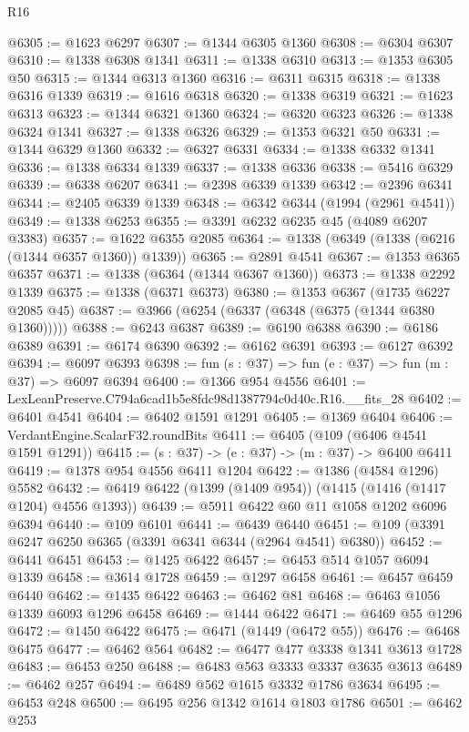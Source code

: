 \begin{lexlean}{R16}
\begin{coremodule}
@6305 := @1623 @6297
@6307 := @1344 @6305 @1360
@6308 := @6304 @6307
@6310 := @1338 @6308 @1341
@6311 := @1338 @6310
@6313 := @1353 @6305 @50
@6315 := @1344 @6313 @1360
@6316 := @6311 @6315
@6318 := @1338 @6316 @1339
@6319 := @1616 @6318
@6320 := @1338 @6319
@6321 := @1623 @6313
@6323 := @1344 @6321 @1360
@6324 := @6320 @6323
@6326 := @1338 @6324 @1341
@6327 := @1338 @6326
@6329 := @1353 @6321 @50
@6331 := @1344 @6329 @1360
@6332 := @6327 @6331
@6334 := @1338 @6332 @1341
@6336 := @1338 @6334 @1339
@6337 := @1338 @6336
@6338 := @5416 @6329
@6339 := @6338 @6207
@6341 := @2398 @6339 @1339
@6342 := @2396 @6341
@6344 := @2405 @6339 @1339
@6348 := @6342 @6344 (@1994 (@2961 @4541))
@6349 := @1338 @6253
@6355 := @3391 @6232 @6235 @45 (@4089 @6207 @3383)
@6357 := @1622 @6355 @2085
@6364 := @1338 (@6349 (@1338 (@6216 (@1344 @6357 @1360)) @1339))
@6365 := @2891 @4541
@6367 := @1353 @6365 @6357
@6371 := @1338 (@6364 (@1344 @6367 @1360))
@6373 := @1338 @2292 @1339
@6375 := @1338 (@6371 @6373)
@6380 := @1353 @6367 (@1735 @6227 @2085 @45)
@6387 := @3966 (@6254 (@6337 (@6348 (@6375 (@1344 @6380 @1360)))))
@6388 := @6243 @6387
@6389 := @6190 @6388
@6390 := @6186 @6389
@6391 := @6174 @6390
@6392 := @6162 @6391
@6393 := @6127 @6392
@6394 := @6097 @6393
@6398 := fun (s : @37) => fun (e : @37) => fun (m : @37) => @6097 @6394
@6400 := @1366 @954 @4556
@6401 := LexLeanPreserve.C794a6cad1b5e8fdc98d1387794c0d40c.R16.__fits_28
@6402 := @6401 @4541
@6404 := @6402 @1591 @1291
@6405 := @1369 @6404
@6406 := VerdantEngine.ScalarF32.roundBits
@6411 := @6405 (@109 (@6406 @4541 @1591 @1291))
@6415 := (s : @37) -> (e : @37) -> (m : @37) -> @6400 @6411
@6419 := @1378 @954 @4556 @6411 @1204
@6422 := @1386 (@4584 @1296) @5582
@6432 := @6419 @6422 (@1399 (@1409 @954)) (@1415 (@1416 (@1417 @1204) @4556 @1393))
@6439 := @5911 @6422 @60 @11 @1058 @1202 @6096 @6394
@6440 := @109 @6101
@6441 := @6439 @6440
@6451 := @109 (@3391 @6247 @6250 @6365 (@3391 @6341 @6344 (@2964 @4541) @6380))
@6452 := @6441 @6451
@6453 := @1425 @6422
@6457 := @6453 @514 @1057 @6094 @1339
@6458 := @3614 @1728
@6459 := @1297 @6458
@6461 := @6457 @6459 @6440
@6462 := @1435 @6422
@6463 := @6462 @81
@6468 := @6463 @1056 @1339 @6093 @1296 @6458
@6469 := @1444 @6422
@6471 := @6469 @55 @1296
@6472 := @1450 @6422
@6475 := @6471 (@1449 (@6472 @55))
@6476 := @6468 @6475
@6477 := @6462 @564
@6482 := @6477 @477 @3338 @1341 @3613 @1728
@6483 := @6453 @250
@6488 := @6483 @563 @3333 @3337 @3635 @3613
@6489 := @6462 @257
@6494 := @6489 @562 @1615 @3332 @1786 @3634
@6495 := @6453 @248
@6500 := @6495 @256 @1342 @1614 @1803 @1786
@6501 := @6462 @253

\end{coremodule}
\end{lexlean}
